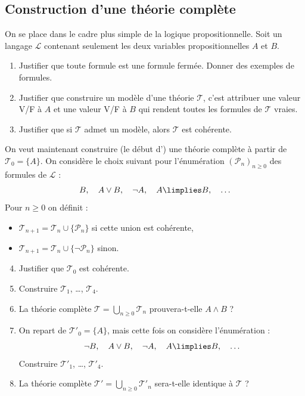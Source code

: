 \documentclass[11pt,class=report,crop=false]{standalone}
\begin{document}
\subsection*{Construction d'une théorie complète}


\begin{exercicecours}
	On se place dans le cadre plus simple de la logique propositionnelle.
	Soit un langage $\mathcal{L}$ contenant seulement les deux variables propositionnelles $A$ et $B$.
	
	\begin{enumerate}
	\item Justifier que toute formule est une formule fermée. Donner des exemples de formules.
	
	\item Justifier que construire un modèle d'une théorie $\mathcal{T}$, c'est attribuer une valeur V/F à $A$ et une valeur V/F à $B$ qui rendent toutes les formules de $\mathcal{T}$ vraies.
	
	\item Justifier que si $\mathcal{T}$ admet un modèle, alors $\mathcal{T}$ est cohérente.
	\end{enumerate}
	
	
	On veut maintenant construire (le début d') une théorie complète à partir
	de $\mathcal{T}_0 = \{ A \}$.
	On considère le choix suivant pour l'énumération $(\mathcal{P}_n)_{n\ge0}$ des formules de $\mathcal{L}$ :
	\[
	B, \quad A \lor B, \quad \lnot A, \quad A \limplies B, \quad \ldots
	\]
	Pour $n \ge 0$ on définit :
	\begin{itemize}
		\item $\mathcal{T}_{n+1} = \mathcal{T}_n \cup \{\mathcal{P}_n\}$ si cette union est cohérente,
		\item $\mathcal{T}_{n+1} = \mathcal{T}_n \cup \{\lnot \mathcal{P}_n\}$ sinon.
	\end{itemize}
	
	\begin{enumerate}
	\setcounter{enumi}{3}
	\item Justifier que $\mathcal{T}_0$ est cohérente.
	
	\item Construire $\mathcal{T}_1$, \ldots, $\mathcal{T}_4$.
	
	\item La théorie complète $\mathcal{T} = \bigcup_{n\ge0} \mathcal{T}_n$  prouvera-t-elle $A \land B$ ?
	
	\item On repart de $\mathcal{T}'_0 = \{ A \}$, mais cette fois on considère l'énumération :
	\[
	\lnot B, \quad A \lor B, \quad \lnot A, \quad A \limplies B, \quad \ldots
	\]	
	Construire $\mathcal{T}'_1$, \ldots, $\mathcal{T}'_4$.
	
	\item La théorie complète $\mathcal{T}' = \bigcup_{n\ge0} \mathcal{T}'_n$
	sera-t-elle identique à $\mathcal{T}$ ?
	\end{enumerate}
\end{exercicecours}
\end{document}
